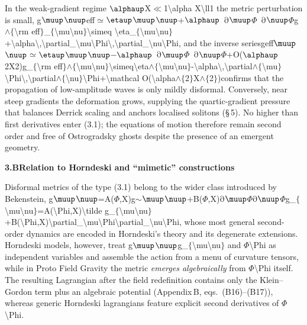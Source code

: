 \documentclass{iopjournal}
\begin{document}
In the weak-gradient regime $\alphaup$X$\mathrm{\ll }$1{\textbackslash}alpha X{\textbackslash}ll1 the metric perturbation is small, g$\muup$$\nuup$eff$\mathrm{\simeq }$$\etaup$$\muup$$\nuup$+$\alphaup$\ $\mathrm{\partial}$$\muup$$\Phi$\ $\mathrm{\partial}$$\nuup$$\Phi$g$\mathrm{\wedge}$$\mathrm{\{}${\textbackslash}rm eff$\mathrm{\}}$\_$\mathrm{\{}${\textbackslash}mu{\textbackslash}nu$\mathrm{\}}${\textbackslash}simeq {\textbackslash}eta\_$\mathrm{\{}${\textbackslash}mu{\textbackslash}nu$\mathrm{\}}$+{\textbackslash}alpha{\textbackslash},{\textbackslash}partial\_{\textbackslash}mu{\textbackslash}Phi{\textbackslash},{\textbackslash}partial\_{\textbackslash}nu{\textbackslash}Phi, and the inverse seriesgeff$\muup$$\nuup$$\mathrm{\simeq }$$\etaup$$\muup$$\nuup$$\mathrm{-}$$\alphaup$\ $\mathrm{\partial}$$\muup$$\Phi$\ $\mathrm{\partial}$$\nuup$$\Phi$+O($\alphaup$2X2)g\_$\mathrm{\{}${\textbackslash}rm eff$\mathrm{\}}$$\mathrm{\wedge}$$\mathrm{\{}${\textbackslash}mu{\textbackslash}nu$\mathrm{\}}${\textbackslash}simeq{\textbackslash}eta$\mathrm{\wedge}$$\mathrm{\{}${\textbackslash}mu{\textbackslash}nu$\mathrm{\}}$-{\textbackslash}alpha{\textbackslash},{\textbackslash}partial$\mathrm{\wedge}$$\mathrm{\{}${\textbackslash}mu$\mathrm{\}}${\textbackslash}Phi{\textbackslash},{\textbackslash}partial$\mathrm{\wedge}$$\mathrm{\{}${\textbackslash}nu$\mathrm{\}}${\textbackslash}Phi+{\textbackslash}mathcal O({\textbackslash}alpha$\mathrm{\wedge}$$\mathrm{\{}$2$\mathrm{\}}$X$\mathrm{\wedge}$$\mathrm{\{}$2$\mathrm{\}}$)confirms that the propagation of low-amplitude waves is only mildly disformal. Conversely, near steep gradients the deformation grows, supplying the quartic-gradient pressure that balances Derrick scaling and anchors localised solitons ({\S} 5). No higher than first derivatives enter (3.1); the equations of motion therefore remain second order and free of Ostrogradsky ghosts despite the presence of an emergent geometry.

\textbf{3.B{\qquad}Relation to Horndeski and ``mimetic'' constructions}

Disformal metrics of the type (3.1) belong to the wider class introduced by Bekenstein, g$\muup$$\nuup$=A($\Phi$,X)g$\mathrm{\sim}$$\muup$$\nuup$+B($\Phi$,X)$\mathrm{\partial}$$\muup$$\Phi$$\mathrm{\partial}$$\nuup$$\Phi$g\_$\mathrm{\{}${\textbackslash}mu{\textbackslash}nu$\mathrm{\}}$=A({\textbackslash}Phi,X){\textbackslash}tilde g\_$\mathrm{\{}${\textbackslash}mu{\textbackslash}nu$\mathrm{\}}$+B({\textbackslash}Phi,X){\textbackslash}partial\_{\textbackslash}mu{\textbackslash}Phi{\textbackslash}partial\_{\textbackslash}nu{\textbackslash}Phi, whose most general second-order dynamics are encoded in Horndeski's theory and its degenerate extensions. Horndeski models, however, treat g$\muup$$\nuup$g\_$\mathrm{\{}${\textbackslash}mu{\textbackslash}nu$\mathrm{\}}$ and $\Phi${\textbackslash}Phi as independent variables and assemble the action from a menu of curvature tensors, while in Proto Field Gravity the metric \textit{emerges algebraically} from $\Phi${\textbackslash}Phi itself. The resulting Lagrangian after the field redefinition contains only the Klein--Gordon term plus an algebraic potential (Appendix B, eqs.~(B16)--(B17)), whereas generic Horndeski lagrangians feature explicit second derivatives of $\Phi${\textbackslash}Phi.
\end{document}
